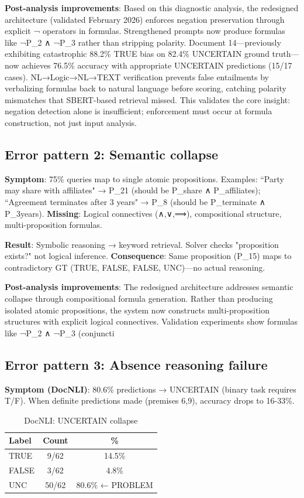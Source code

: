 \documentclass[12pt,a4paper]{article}
\begin{document}
\textbf{Post-analysis improvements}: Based on this diagnostic analysis, the redesigned architecture (validated February 2026) enforces negation preservation through explicit ¬ operators in formulas. Strengthened prompts now produce formulas like ¬P\_2 ∧ ¬P\_3 rather than stripping polarity. Document 14—previously exhibiting catastrophic 88.2\% TRUE bias on 82.4\% UNCERTAIN ground truth—now achieves 76.5\% accuracy with appropriate UNCERTAIN predictions (15/17 cases). NL→Logic→NL→TEXT verification prevents false entailments by verbalizing formulas back to natural language before scoring, catching polarity mismatches that SBERT-based retrieval missed. This validates the core insight: negation detection alone is insufficient; enforcement must occur at formula construction, not just input analysis.

\subsection{Error pattern 2: Semantic collapse}

\textbf{Symptom}: 75\% queries map to single atomic propositions. Examples: ``Party may share with affiliates" → P\_21 (should be P\_share ∧ P\_affiliates); ``Agreement terminates after 3 years" → P\_8 (should be P\_terminate ∧ P\_3years). \textbf{Missing}: Logical connectives (∧,∨,⟹), compositional structure, multi-proposition formulas.

\textbf{Result}: Symbolic reasoning → keyword retrieval. Solver checks "proposition exists?" not logical inference. \textbf{Consequence}: Same proposition (P\_15) maps to contradictory GT (TRUE, FALSE, FALSE, UNC)—no actual reasoning.

\textbf{Post-analysis improvements}: The redesigned architecture addresses semantic collapse through compositional formula generation. Rather than producing isolated atomic propositions, the system now constructs multi-proposition structures with explicit logical connectives. Validation experiments show formulas like ¬P\_2 ∧ ¬P\_3 (conjuncti


\subsection{Error pattern 3: Absence reasoning failure}

\textbf{Symptom (DocNLI)}: 80.6\% predictions → UNCERTAIN (binary task requires T/F). When definite predictions made (premises 6,9), accuracy drops to 16-33\%.

\begin{table}[h]
\centering
\small
\begin{tabular}{lcc}
\toprule
\textbf{Label} & \textbf{Count} & \textbf{\%} \\
\midrule
TRUE  & 9/62  & 14.5\% \\
FALSE & 3/62  & 4.8\% \\
UNC   & 50/62 & 80.6\% ← PROBLEM \\
\bottomrule
\end{tabular}
\caption{DocNLI: UNCERTAIN collapse}
\end{table}
\end{document}

